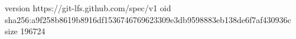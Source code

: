 version https://git-lfs.github.com/spec/v1
oid sha256:a9f258b8619b8916df1536746769623309e3db9598883eb138de6f7af430936c
size 196724
